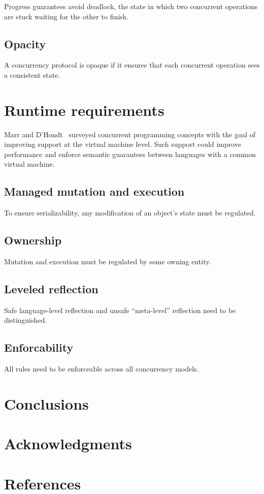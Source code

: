 \documentclass{sig-alternate}
\begin{document}
Progress guarantees avoid deadlock, the state in which two concurrent operations are stuck waiting for the other to finish.

\subsection{Opacity}

A concurrency protocol is opaque if it ensures that each concurrent operation sees a consistent state.

\section{Runtime requirements}

Marr and D'Hondt~\cite{Marr2012} surveyed concurrent programming concepts with the goal of improving support at the virtual machine level. Such support could improve performance and enforce semantic guarantees between languages with a common virtual machine.

\subsection{Managed mutation and execution}

To ensure serializability, any modification of an object's state must be regulated.

\subsection{Ownership}

Mutation and execution must be regulated by some owning entity.

\subsection{Leveled reflection}

Safe language-level reflection and unsafe ``meta-level'' reflection need to be distinguished.

\subsection{Enforcability}

All rules need to be enforceable across all concurrency models.

\section{Conclusions}

\section{Acknowledgments}

\section{References}

\printbibliography[heading=none]
\end{document}

